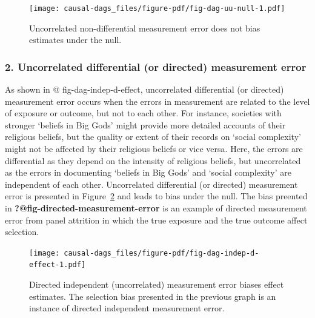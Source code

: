 \documentclass[
  singlecolumn]{report}
\begin{document}
\begin{figure}

{\centering \texttt{[image: causal-dags\_files/figure-pdf/fig-dag-uu-null-1.pdf]}

}

\caption{\label{fig-dag-uu-null}Uncorrelated non-differential
measurement error does not bias estimates under the null.}

\end{figure}

\hypertarget{uncorrelated-differential-or-directed-measurement-error}{%
\subsubsection{\texorpdfstring{2. \textbf{Uncorrelated differential (or
directed) measurement
error}}{2. Uncorrelated differential (or directed) measurement error}}\label{uncorrelated-differential-or-directed-measurement-error}}

As shown in @ fig-dag-indep-d-effect, uncorrelated differential (or
directed) measurement error occurs when the errors in measurement are
related to the level of exposure or outcome, but not to each other. For
instance, societies with stronger `beliefs in Big Gods' might provide
more detailed accounts of their religious beliefs, but the quality or
extent of their records on `social complexity' might not be affected by
their religious beliefs or vice versa. Here, the errors are differential
as they depend on the intensity of religious beliefs, but uncorrelated
as the errors in documenting `beliefs in Big Gods' and `social
complexity' are independent of each other. Uncorrelated differential (or
directed) measurement error is presented in
Figure~\ref{fig-dag-indep-d-effect} and leads to bias under the null.
The bias preented in \textbf{?@fig-directed-measurement-error} is an
example of directed measurement error from panel attrition in which the
true exposure and the true outcome affect selection.

\begin{figure}

{\centering \texttt{[image: causal-dags\_files/figure-pdf/fig-dag-indep-d-effect-1.pdf]}

}

\caption{\label{fig-dag-indep-d-effect}Directed independent
(uncorrelated) measurement error biases effect estimates. The selection
bias presented in the previous graph is an instance of directed
independent measurement error.}

\end{figure}
\end{document}
